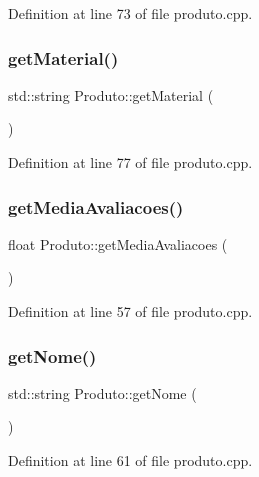 Definition at line 73 of file produto.\+cpp.

\mbox{\label{class_produto_a516283381dcf330ccf26b059ed6861c0}} 
\subsubsection{\texorpdfstring{get\+Material()}{getMaterial()}}
{\footnotesize\ttfamily std\+::string Produto\+::get\+Material (\begin{DoxyParamCaption}{ }\end{DoxyParamCaption})}



Definition at line 77 of file produto.\+cpp.

\mbox{\label{class_produto_af3f6579377e033fb6d8349ba72b6d962}} 
\subsubsection{\texorpdfstring{get\+Media\+Avaliacoes()}{getMediaAvaliacoes()}}
{\footnotesize\ttfamily float Produto\+::get\+Media\+Avaliacoes (\begin{DoxyParamCaption}{ }\end{DoxyParamCaption})}



Definition at line 57 of file produto.\+cpp.

\mbox{\label{class_produto_a38b3347261d612e436233379af9831fd}} 
\subsubsection{\texorpdfstring{get\+Nome()}{getNome()}}
{\footnotesize\ttfamily std\+::string Produto\+::get\+Nome (\begin{DoxyParamCaption}{ }\end{DoxyParamCaption})}



Definition at line 61 of file produto.\+cpp.

\mbox{\label{class_produto_afe16477be14329f4865ed1cf0f295a45}} 

